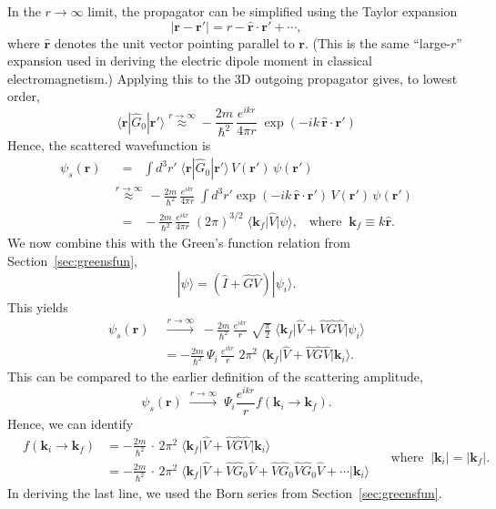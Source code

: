 \documentclass[pra,12pt]{revtex4}
\begin{document}
In the $r\rightarrow\infty$ limit, the propagator can be simplified
using the Taylor expansion
$$|\mathbf{r} - \mathbf{r}'| = r - \hat{\mathbf{r}} \cdot \mathbf{r}' + \cdots,$$
where $\hat{\mathbf{r}}$ denotes the unit vector pointing parallel to
$\mathbf{r}$.  (This is the same ``large-$r$'' expansion used in
deriving the electric dipole moment in classical electromagnetism.)
Applying this to the 3D outgoing propagator gives, to lowest order,
$$\langle\mathbf{r}|\hat{G}_0|\mathbf{r}'\rangle \overset{r\rightarrow\infty}{\approx} - \frac{2m}{\hbar^2}\, \frac{e^{ikr}}{4\pi r}\; \exp\left(-ik \, \hat{\mathbf{r}} \cdot \mathbf{r}'\right)$$
Hence, the scattered wavefunction is
$$\begin{aligned}\psi_s(\mathbf{r}) &\;\;= \;\; \int d^3r'\; \langle\mathbf{r}|\hat{G}_0|\mathbf{r}'\rangle\, V(\mathbf{r}')\, \psi(\mathbf{r}') \\ &\overset{r\rightarrow\infty}{\approx} \, - \frac{2m}{\hbar^2} \, \frac{e^{ikr}}{4\pi r}\; \int d^3r' \exp\left(-ik \, \hat{\mathbf{r}} \cdot \mathbf{r}'\right)\, V(\mathbf{r}')\, \psi(\mathbf{r}') \\ &\;\;=\;\; - \frac{2m}{\hbar^2} \, \frac{e^{ikr}}{4\pi r} \; (2\pi)^{3/2} \; \big\langle \mathbf{k}_f \big|\hat{V}\big|\psi\big\rangle, \;\;\;\mathrm{where}\;\; \mathbf{k}_f \equiv k \hat{\mathbf{r}}. \end{aligned}$$
We now combine this with the Green's function relation from
Section~\ref{sec:greensfun},
$$|\psi\rangle = \left(\hat{I} + \hat{G}\hat{V}\right)|\psi_i\rangle.$$
This yields
$$\begin{aligned}\psi_s(\mathbf{r}) \; &\overset{r\rightarrow\infty}{\longrightarrow} \; - \frac{2m}{\hbar^2} \, \frac{e^{ikr}}{r} \; \sqrt{\frac{\pi}{2}} \; \big\langle \mathbf{k}_f \big|\hat{V} + \hat{V}\hat{G}\hat{V}\big|\psi_i\big\rangle \\ &= - \frac{2m}{\hbar^2} \, \Psi_i\, \frac{e^{ikr}}{r} \; 2\pi^2 \; \big\langle \mathbf{k}_f \big|\hat{V} + \hat{V}\hat{G}\hat{V}\big|\mathbf{k}_i\big\rangle.\end{aligned}$$
This can be compared to the earlier definition of the scattering amplitude,
$$\psi_s(\mathbf{r}) \; \overset{r\rightarrow\infty}{\longrightarrow} \; \Psi_i \frac{e^{ikr}}{r} f(\mathbf{k}_i\rightarrow \mathbf{k}_f ).$$
Hence, we can identify
$$\boxed{\;\;\;\begin{aligned}f(\mathbf{k}_i \rightarrow \mathbf{k}_f) &= - \frac{2m}{\hbar^2} \,\cdot \, 2\pi^2 \; \big\langle \mathbf{k}_f\big| \hat{V} + \hat{V}\hat{G} \hat{V} \big|\mathbf{k}_i\big\rangle \\ &= - \frac{2m}{\hbar^2} \,\cdot \, 2\pi^2 \; \big\langle \mathbf{k}_f\big| \hat{V} + \hat{V}\hat{G}_0 \hat{V} + \hat{V} \hat{G}_0 \hat{V} \hat{G}_0\hat{V} + \cdots \big|\mathbf{k}_i\big\rangle  \end{aligned}\quad\; \mathrm{where}\;\; |\mathbf{k}_i| = |\mathbf{k}_f|.\;\;\;}$$
In deriving the last line, we used the Born series from
Section~\ref{sec:greensfun}.
\end{document}
